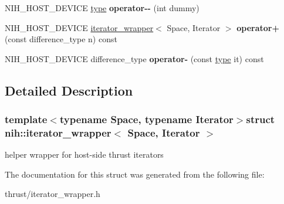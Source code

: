 \begin{DoxyCompactItemize}
\item 
\hypertarget{structnih_1_1iterator__wrapper_a2b90497f750402492ad42a3f0a3a16d3}{
\-N\-I\-H\-\_\-\-H\-O\-S\-T\-\_\-\-D\-E\-V\-I\-C\-E \hyperlink{structnih_1_1iterator__wrapper}{type} {\bfseries operator-\/-\/} (int dummy)}
\label{structnih_1_1iterator__wrapper_a2b90497f750402492ad42a3f0a3a16d3}

\item 
\hypertarget{structnih_1_1iterator__wrapper_a1348e6959afb8c746d6ed562b49f055b}{
\-N\-I\-H\-\_\-\-H\-O\-S\-T\-\_\-\-D\-E\-V\-I\-C\-E \*
\hyperlink{structnih_1_1iterator__wrapper}{iterator\-\_\-wrapper}$<$ \-Space, \*
\-Iterator $>$ {\bfseries operator+} (const difference\-\_\-type n) const }
\label{structnih_1_1iterator__wrapper_a1348e6959afb8c746d6ed562b49f055b}

\item 
\hypertarget{structnih_1_1iterator__wrapper_afa7abb5801720e66ffde56b64063f8a9}{
\-N\-I\-H\-\_\-\-H\-O\-S\-T\-\_\-\-D\-E\-V\-I\-C\-E difference\-\_\-type {\bfseries operator-\/} (const \hyperlink{structnih_1_1iterator__wrapper}{type} it) const }
\label{structnih_1_1iterator__wrapper_afa7abb5801720e66ffde56b64063f8a9}

\end{DoxyCompactItemize}


\subsection{\-Detailed \-Description}
\subsubsection*{template$<$typename Space, typename Iterator$>$struct nih\-::iterator\-\_\-wrapper$<$ Space, Iterator $>$}

helper wrapper for host-\/side thrust iterators 

\-The documentation for this struct was generated from the following file\-:\begin{DoxyCompactItemize}
\item 
thrust/iterator\-\_\-wrapper.\-h\end{DoxyCompactItemize}
